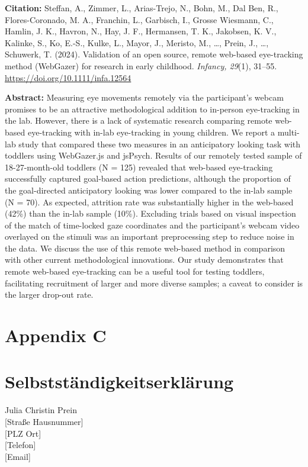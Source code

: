 \documentclass[
]{scrbook}
\begin{document}
\textbf{Citation:} Steffan, A., Zimmer, L., Arias-Trejo, N., Bohn, M., Dal Ben, R., Flores-Coronado, M. A., Franchin, L., Garbisch, I., Grosse Wiesmann, C., Hamlin, J. K., Havron, N., Hay, J. F., Hermansen, T. K., Jakobsen, K. V., Kalinke, S., Ko, E.-S., Kulke, L., Mayor, J., Meristo, M., \ldots, Prein, J., \ldots, Schuwerk, T. (2024). Validation of an open source, remote web-based eye-tracking method (WebGazer) for research in early childhood. \emph{Infancy, 29}(1), 31--55. \url{https://doi.org/10.1111/infa.12564}

\textbf{Abstract:} Measuring eye movements remotely via the participant's webcam promises to be an attractive methodological addition to in-person eye-tracking in the lab. However, there is a lack of systematic research comparing remote web-based eye-tracking with in-lab eye-tracking in young children. We report a multi-lab study that compared these two measures in an anticipatory looking task with toddlers using WebGazer.js and jsPsych. Results of our remotely tested sample of 18-27-month-old toddlers (N = 125) revealed that web-based eye-tracking successfully captured goal-based action predictions, although the proportion of the goal-directed anticipatory looking was lower compared to the in-lab sample (N = 70). As expected, attrition rate was substantially higher in the web-based (42\%) than the in-lab sample (10\%). Excluding trials based on visual inspection of the match of time-locked gaze coordinates and the participant's webcam video overlayed on the stimuli was an important preprocessing step to reduce noise in the data. We discuss the use of this remote web-based method in comparison with other current methodological innovations. Our study demonstrates that remote web-based eye-tracking can be a useful tool for testing toddlers, facilitating recruitment of larger and more diverse samples; a caveat to consider is the larger drop-out rate.

\chapter{Appendix C}\label{appendixC}

\chapter{Selbstständigkeitserklärung}\label{selbststaendigkeit}

Julia Christin Prein\\
{[}Straße Hausnummer{]}\\
{[}PLZ Ort{]}\\
{[}Telefon{]}\\
{[}Email{]}\\
\end{document}
